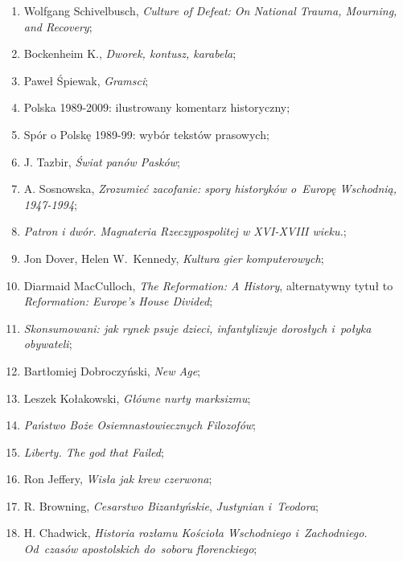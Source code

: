 \documentclass[a4paper,11pt]{article}
\begin{document}
\begin{enumerate}
\item Wolfgang Schivelbusch, \textit{Culture of Defeat: On National
    Trauma, Mourning, and Recovery};

\item Bockenheim K., \textit{Dworek, kontusz, karabela};

\item Paweł Śpiewak, \textit{Gramsci};

\item Polska 1989-2009: ilustrowany komentarz historyczny;

\item Spór o Polskę 1989-99: wybór tekstów prasowych;

\item J. Tazbir, \textit{Świat panów Pasków};

\item A. Sosnowska, \textit{Zrozumieć zacofanie: spory historyków
    o~Europę Wschodnią, 1947-1994};

\item \textit{Patron i dwór. Magnateria Rzeczypospolitej w XVI-XVIII
    wieku.};

\item Jon Dover, Helen W.~Kennedy, \textit{Kultura gier komputerowych};

\item Diarmaid MacCulloch, \textit{The Reformation: A History},
  alternatywny tytuł to \textit{Reformation: Europe's House Divided};

\item \textit{Skonsumowani: jak rynek psuje dzieci, infantylizuje
    dorosłych i~połyka obywateli};

\item Bartłomiej Dobroczyński, \textit{New Age};

\item Leszek Kołakowski, \textit{Główne nurty marksizmu};

\item \textit{Państwo Boże Osiemnastowiecznych Filozofów};

\item \textit{Liberty. The god that Failed};

\item Ron Jeffery, \textit{Wisła jak krew czerwona};

\item R. Browning, \textit{Cesarstwo Bizantyńskie}, \textit{Justynian
    i~Teodora};

\item H. Chadwick, \textit{Historia rozłamu Kościoła Wschodniego
    i~Zachodniego. Od~czasów apostolskich do~soboru florenckiego};


\end{enumerate}
\end{document}
